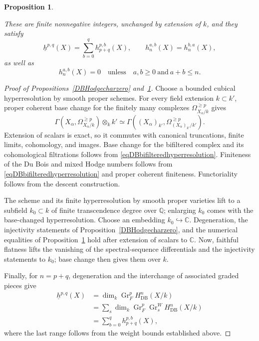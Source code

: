 \documentclass{amsart}
\theoremstyle{plain}
\newtheorem{prop}{Proposition}[section]
\theoremstyle{definition}
\newcommand{\bbC}{\mathbb{C}}
\newcommand{\bbQ}{\mathbb{Q}}
\DeclareMathOperator{\Gr}{Gr}
\newcommand{\DB}{\mathrm{DB}}
\begin{document}
\begin{prop}\label{numbersoverk}
    


These are finite nonnegative integers, unchanged by extension of $k$, and they satisfy
\[
\underline h^{p,q}(X)=\sum_{b=0}^{q}h_{p+q}^{p,b}(X),
\qquad h_n^{a,b}(X)=h_n^{b,a}(X),
\]
as well as
\[
h_n^{a,b}(X)=0\quad\text{unless}\quad
a,b\geq0\ \text{and}\ a+b\leq n.
\]
\end{prop}


\begin{proof}[Proof of Propositions~\ref{DBHodgecharzero}
and~\ref{numbersoverk}]

Choose a bounded cubical hyperresolution by smooth proper schemes.
For every field extension $k\subset k'$, proper coherent base change for the finitely many complexes $\Omega^{\geq p}_{X_\alpha/k}$ gives
\[
\Gamma(X_\alpha,\Omega^{\geq p}_{X_\alpha/k})\otimes_k k'
 \simeq
\Gamma((X_\alpha)_{k'},
        \Omega^{\geq p}_{(X_\alpha)_{k'}/k'}).
\]
Extension of scalars is exact, so it commutes with canonical truncations, finite limits, cohomology, and images. Base change for the bifiltered complex and its cohomological filtrations follows from \eqref{eqDBbifilteredhyperresolution}. Finiteness of the Du Bois and mixed Hodge numbers follows from \eqref{eqDBbifilteredhyperresolution} and proper coherent finiteness.
Functoriality follows from the descent construction.

The scheme and its finite hyperresolution by smooth proper varieties
lift to a subfield $k_0\subset k$ of finite transcendence degree over $\bbQ$; enlarging $k_0$ comes with the base-changed hyperresolution. Choose an embedding
$k_0\hookrightarrow\mathbb C$. Degeneration, the injectivity statements of Proposition~\ref{DBHodgecharzero}, and the numerical equalities of Proposition~\ref{numbersoverk} hold after extension of scalars to $\bbC$. Now, faithful flatness
lifts the vanishing of the spectral-sequence differentials and the injectivity statements to
$k_0$; base change then gives them over $k$.


Finally, for $n=p+q$, degeneration and the interchange of associated graded pieces give
\[
\begin{aligned}
\underline h^{p,q}(X)
 &=\dim_k\Gr_F^pH^n_{\DB}(X/k)\\
 &=\sum_s\dim_k\Gr_F^p
                  \Gr_s^WH^n_{\DB}(X/k)\\
 &=\sum_{b=0}^{q}h_{p+q}^{p,b}(X),
\end{aligned}
\]
where the last range follows from the weight bounds  established above.
\end{proof}
\end{document}
